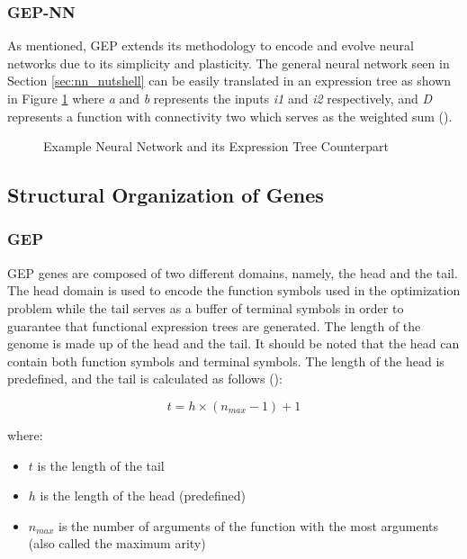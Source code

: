 \subsubsection{GEP-NN}
\noindent As mentioned, GEP extends its methodology to encode and evolve neural networks due to its simplicity and plasticity. The general neural network seen in Section \ref{sec:nn_nutshell} can be easily translated in an expression tree as shown in Figure \ref{fig:gep_nn_example} where \textit{a} and \textit{b} represents the inputs \textit{i1} and \textit{i2} respectively, and \textit{D} represents a function with connectivity two which serves as the weighted sum (\cite{ferreira2006gene}).

\begin{figure}[H] %
	\centering %
	\caption{Example Neural Network and its Expression Tree Counterpart}
	\label{fig:gep_nn_example} %
\end{figure}

\subsection{Structural Organization of Genes}
\subsubsection{GEP}
GEP genes are composed of two different domains, namely, the head and the tail. The head domain is used to encode the function symbols used in the optimization problem while the tail serves as a buffer of terminal symbols in order to guarantee that functional expression trees are generated. The length of the genome is made up of the head and the tail. It should be noted that the head can contain both function symbols and terminal symbols. The length of the head is predefined, and the tail is calculated as follows (\cite{ferreira2006gene}):
\begin{ceqn}
    \begin{equation}\label{alg:prefix}
        t = h \times (n_{max} - 1) + 1
    \end{equation}
\end{ceqn}

\noindent where:
\begin{itemize}
    \item \textbf{$t$} is the length of the tail
    \item \textbf{$h$} is the length of the head (predefined)
    \item \textbf{$n_{max}$} is the number of arguments of the function with the most arguments (also called the maximum arity)
\end{itemize}

